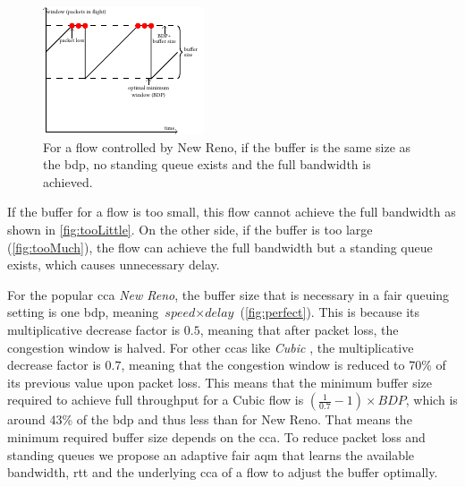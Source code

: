 \documentclass[conference]{IEEEtran}
\begin{document}
\begin{figure}[h]
\includegraphics[width=\columnwidth]{figures/cocoa_illustration_perfect.pdf}
\caption{For a flow controlled by New Reno, if the buffer is the same size as the \gls{bdp}, no standing queue exists and the full bandwidth is achieved.}
\label{fig:perfect}
\end{figure}

If the buffer for a flow is too small, this flow cannot achieve the full bandwidth as shown in \autoref{fig:tooLittle}. On the other side, if the buffer is too large (\autoref{fig:tooMuch}), the flow can achieve the full bandwidth but a standing queue exists, which causes unnecessary delay.  

For the popular \gls{cca} \textit{New Reno}, the buffer size that is necessary in a fair queuing setting is one \gls{bdp}, meaning $\textit{speed}\times\textit{delay}$ (\autoref{fig:perfect}). This is because its multiplicative decrease factor is $0.5$, meaning that after packet loss, the congestion window is halved. For other \glspl{cca} like \textit{Cubic} \cite{ha_cubic:_2008}, the multiplicative decrease factor is $0.7$, meaning that the congestion window is reduced to 70\% of its previous value upon packet loss. This means that the minimum buffer size required to achieve full throughput for a Cubic flow is $\left(\frac{1}{0.7}-1\right)\times \textit{BDP}$, which is around 43\% of the \gls{bdp} and thus less than for New Reno. That means the minimum required buffer size depends on the \gls{cca}. To reduce packet loss and standing queues we propose an adaptive fair \gls{aqm} that learns the available bandwidth, \gls{rtt} and the underlying \gls{cca} of a flow to adjust the buffer optimally. 
\end{document}
